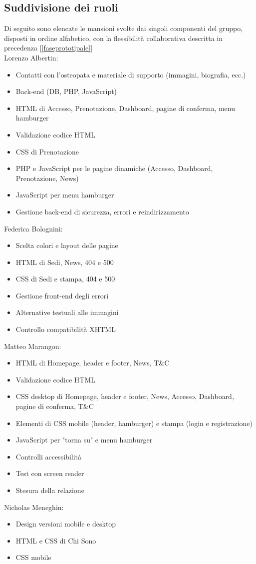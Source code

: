 \documentclass{article}
\begin{document}
\subsection{Suddivisione dei ruoli} \label{ruoli}
Di seguito sono elencate le mansioni svolte dai singoli componenti del gruppo, disposti in ordine alfabetico, con la flessibilità collaborativa descritta in precedenza [\ref{faseprototipale}]\\
Lorenzo Albertin:
\begin{itemize}
    \item Contatti con l'osteopata e materiale di supporto (immagini, biografia, ecc.)
    \item Back-end (DB, PHP, JavaScript)
    \item HTML di Accesso, Prenotazione, Dashboard, pagine di conferma, menu hamburger
    \item Validazione codice HTML
    \item CSS di Prenotazione
    \item PHP e JavaScript per le pagine dinamiche (Accesso, Dashboard, Prenotazione, News)
    \item JavaScript per menu hamburger
    \item Gestione back-end di sicurezza, errori e reindirizzamento
\end{itemize}
Federica Bolognini:
\begin{itemize}
    \item Scelta colori e layout delle pagine
    \item HTML di Sedi, News, 404 e 500
    \item CSS di Sedi e stampa, 404 e 500
    \item Gestione front-end degli errori
    \item Alternative testuali alle immagini
    \item Controllo compatibilità XHTML
\end{itemize}
Matteo Marangon:
\begin{itemize}
    \item HTML di Homepage, header e footer, News, T\&C
    \item Validazione codice HTML
    \item CSS desktop di Homepage, header e footer, News, Accesso, Dashboard, pagine di conferma, T\&C
    \item Elementi di CSS mobile (header, hamburger) e stampa (login e registrazione)
    \item JavaScript per "torna su" e menu hamburger
    \item Controlli accessibilità
    \item Test con screen reader
    \item Stesura della relazione
\end{itemize}
Nicholas Meneghin:
\begin{itemize}
    \item Design versioni mobile e desktop
    \item HTML e CSS di Chi Sono
    \item CSS mobile
\end{itemize}
\end{document}
